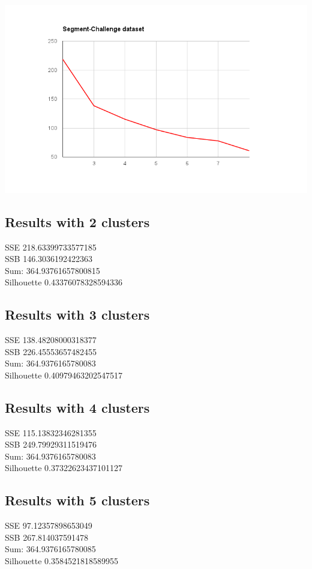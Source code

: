 \documentclass[11pt,a4paper]{article}
\begin{document}
\includegraphics[width=\textwidth]{pics/chart_segment_challenge}

\subsection{Results with 2 clusters}
SSE 218.63399733577185 \\
SSB 146.3036192422363 \\
Sum: 364.93761657800815 \\
Silhouette 0.43376078328594336 \\

\subsection{Results with 3 clusters}
SSE 138.48208000318377 \\
SSB 226.45553657482455 \\
Sum: 364.9376165780083 \\
Silhouette 0.40979463202547517 \\

\subsection{Results with 4 clusters}
SSE 115.13832346281355 \\
SSB 249.79929311519476 \\
Sum: 364.9376165780083 \\
Silhouette 0.37322623437101127 \\

\subsection{Results with 5 clusters}
SSE 97.12357898653049 \\
SSB 267.814037591478 \\
Sum: 364.9376165780085 \\
Silhouette 0.3584521818589955 \\
\end{document}
